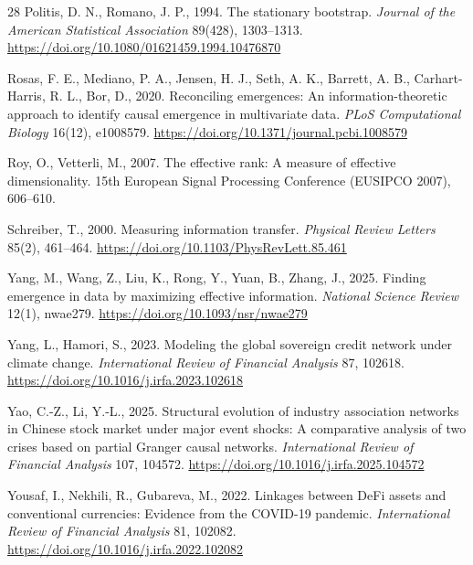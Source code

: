 \documentclass[review,12pt,authoryear]{elsarticle}
\begin{document}
\begin{thebibliography}{28}
Politis, D. N., Romano, J. P., 1994.
\newblock The stationary bootstrap.
\newblock \emph{Journal of the American Statistical Association} 89(428), 1303--1313. \url{https://doi.org/10.1080/01621459.1994.10476870}

Rosas, F. E., Mediano, P. A., Jensen, H. J., Seth, A. K., Barrett, A. B., Carhart-Harris, R. L., Bor, D., 2020.
\newblock Reconciling emergences: An information-theoretic approach to identify causal emergence in multivariate data.
\newblock \emph{PLoS Computational Biology} 16(12), e1008579. \url{https://doi.org/10.1371/journal.pcbi.1008579}

Roy, O., Vetterli, M., 2007.
\newblock The effective rank: A measure of effective dimensionality.
\newblock 15th European Signal Processing Conference (EUSIPCO 2007), 606--610.

Schreiber, T., 2000.
\newblock Measuring information transfer.
\newblock \emph{Physical Review Letters} 85(2), 461--464. \url{https://doi.org/10.1103/PhysRevLett.85.461}

Yang, M., Wang, Z., Liu, K., Rong, Y., Yuan, B., Zhang, J., 2025.
\newblock Finding emergence in data by maximizing effective information.
\newblock \emph{National Science Review} 12(1), nwae279. \url{https://doi.org/10.1093/nsr/nwae279}

Yang, L., Hamori, S., 2023.
\newblock Modeling the global sovereign credit network under climate change.
\newblock \emph{International Review of Financial Analysis} 87, 102618. \url{https://doi.org/10.1016/j.irfa.2023.102618}

Yao, C.-Z., Li, Y.-L., 2025.
\newblock Structural evolution of industry association networks in Chinese stock market under major event shocks: A comparative analysis of two crises based on partial Granger causal networks.
\newblock \emph{International Review of Financial Analysis} 107, 104572. \url{https://doi.org/10.1016/j.irfa.2025.104572}

Yousaf, I., Nekhili, R., Gubareva, M., 2022.
\newblock Linkages between DeFi assets and conventional currencies: Evidence from the COVID-19 pandemic.
\newblock \emph{International Review of Financial Analysis} 81, 102082. \url{https://doi.org/10.1016/j.irfa.2022.102082}
\end{thebibliography}
\end{document}
